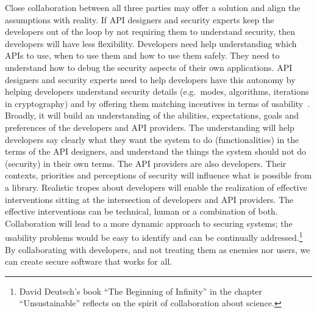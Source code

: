 \documentclass[conference]{IEEEtran}
\begin{document}
Close collaboration between all three parties may offer a solution and  align the assumptions with reality. If API designers and security experts keep the developers out of the loop by not requiring them to understand security, then developers will have less flexibility. Developers need help understanding which APIs to use, when to use them and how to use them safely. They need to understand how to debug the security aspects of their own applications.  API designers and security experts need to help developers have this autonomy by helping developers understand security details (e.g.~modes, algorithms, iterations in cryptography) and by offering them matching incentives in terms of usability~\cite{aside2012,weir2020,tahaei2021sat}. Broadly, it will build an understanding of the abilities, expectations, goals and preferences of the developers and API providers. The understanding will help developers say clearly what they want the system to do (functionalities) in the terms of the API designers, and understand the things the system should not do (security) in their own terms.  The API providers are also developers. Their contexts, priorities and perceptions of security will influence what is possible from a library. Realistic tropes about developers will enable the realization of effective interventions sitting at the intersection of developers and API providers. The effective interventions can be technical, human or a combination of both. Collaboration will lead to a more dynamic approach to securing systems; the usability problems would be easy to identify and can be continually addressed.\footnote{David Deutsch's book ``The Beginning of Infinity'' in the chapter ``Unsustainable'' reflects on the spirit of collaboration about science.} By collaborating with developers, and not treating them as enemies nor users, we can create secure software that works for all.
\end{document}
